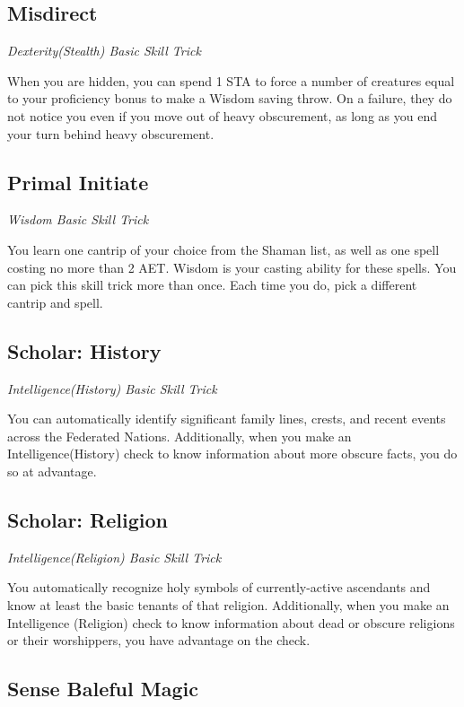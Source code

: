 \subsection{Misdirect}\label{st:misdirect}

\textit{Dexterity(Stealth) Basic Skill Trick}

When you are hidden, you can spend 1 STA to force a number of creatures equal to your proficiency bonus to make a Wisdom saving throw. On a failure, they do not notice you even if you move out of heavy obscurement, as long as you end your turn behind heavy obscurement.

\subsection{Primal Initiate}

\textit{Wisdom Basic Skill Trick}

You learn one cantrip of your choice from the Shaman list, as well as one spell costing no more than 2 AET. Wisdom is your casting ability for these spells. You can pick this skill trick more than once. Each time you do, pick a different cantrip and spell.

\subsection{Scholar: History}\label{st:scholar-history}

\textit{Intelligence(History) Basic Skill Trick}

You can automatically identify significant family lines, crests, and recent events across the Federated Nations. Additionally, when you make an Intelligence(History) check to know information about more obscure facts, you do so at advantage.

\subsection{Scholar: Religion}\label{st:scholar-religion}

\textit{Intelligence(Religion) Basic Skill Trick}

You automatically recognize holy symbols of currently-active ascendants and know at least the basic tenants of that religion. Additionally, when you make an Intelligence (Religion) check to know information about dead or obscure religions or their worshippers, you have advantage on the check.

\subsection{Sense Baleful Magic}\label{st:sense-baleful-magic}

